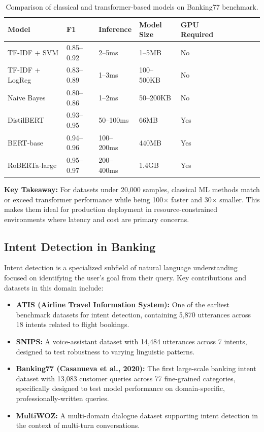 \documentclass[12pt,a4paper]{article}
\renewcommand{\arraystretch}{1.5}
\newcommand{\goldrowcolors}{%
    \rowcolors{2}{bgCard}{bgDark}%
}
\newcommand{\tableheader}[1]{\textcolor{accentGold}{\textbf{#1}}}
\newcommand{\tablehdrrow}{\rowcolor{accentCard}}
\begin{document}
\begin{table}[H]
\centering
\goldrowcolors
\renewcommand{\arraystretch}{1.5}
\begin{tabular}{@{}L{4cm} V C{2.5cm} V C{2.5cm} V C{2.5cm} V C{2.5cm}@{}}
\toprule
\tablehdrrow
\tableheader{Model} & \tableheader{F1} & \tableheader{Inference} & \tableheader{Model Size} & \tableheader{GPU Required} \\
\midrule
TF-IDF + SVM & 0.85--0.92 & 2--5ms & 1--5MB & No \\
TF-IDF + LogReg & 0.83--0.89 & 1--3ms & 100--500KB & No \\
Naive Bayes & 0.80--0.86 & 1--2ms & 50--200KB & No \\
DistilBERT & 0.93--0.95 & 50--100ms & 66MB & Yes \\
BERT-base & 0.94--0.96 & 100--200ms & 440MB & Yes \\
RoBERTa-large & 0.95--0.97 & 200--400ms & 1.4GB & Yes \\
\bottomrule
\end{tabular}
\caption{Comparison of classical and transformer-based models on Banking77 benchmark.}
\label{tab:model-comparison-literature}
\end{table}

\begin{tipbox}
\textbf{Key Takeaway:} For datasets under 20,000 samples, classical ML methods match or exceed transformer performance while being 100$\times$ faster and 30$\times$ smaller. This makes them ideal for production deployment in resource-constrained environments where latency and cost are primary concerns.
\end{tipbox}

\subsection{Intent Detection in Banking}
\label{subsec:intent-detection}

Intent detection is a specialized subfield of natural language understanding focused on identifying the user's goal from their query. Key contributions and datasets in this domain include:

\begin{itemize}[leftmargin=*]
    \item \textbf{ATIS (Airline Travel Information System):} One of the earliest benchmark datasets for intent detection, containing 5,870 utterances across 18 intents related to flight bookings.
    \item \textbf{SNIPS:} A voice-assistant dataset with 14,484 utterances across 7 intents, designed to test robustness to varying linguistic patterns.
    \item \textbf{Banking77 (Casanueva et al., 2020):} The first large-scale banking intent dataset with 13,083 customer queries across 77 fine-grained categories, specifically designed to test model performance on domain-specific, professionally-written queries.
    \item \textbf{MultiWOZ:} A multi-domain dialogue dataset supporting intent detection in the context of multi-turn conversations.
\end{itemize}
\end{document}
